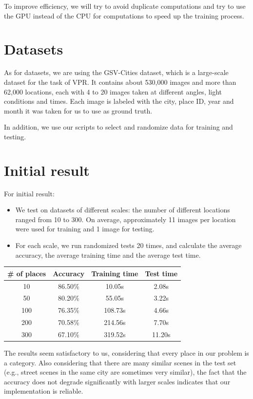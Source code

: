 \documentclass{article}
\begin{document}
To improve efficiency, we will try to avoid duplicate computations and try to use the GPU instead of the CPU for computations to speed up the training process.

\section{Datasets}

As for datasets, we are using the GSV-Cities dataset\cite{ali2022gsv}, which is a large-scale dataset for the task of VPR. It contains about 530,000 images and more than 62,000 locations, each with 4 to 20 images taken at different angles, light conditions and times. Each image is labeled with the city, place ID, year and month it was taken for us to use as ground truth.

In addition, we use our scripts to select and randomize data for training and testing.

\section{Initial result}

For initial result:

\begin{itemize}
    \item We test on datasets of different scales: the number of different locations ranged from 10 to 300. On average, approximately 11 images per location were used for training and 1 image for testing.
    \item For each scale, we run randomized tests 20 times, and calculate the average accuracy, the average training time and the average test time.
\end{itemize}

\begin{tabular}{|c|c|c|c|}
    \hline \textbf{\# of places} & \textbf{Accuracy} & \textbf{Training time} & \textbf{Test time}\\
    \hline 10 & 86.50\% & 10.05s & 2.08s\\
    \hline 50 & 80.20\% & 55.05s & 3.22s\\
    \hline 100 & 76.35\% & 108.73s & 4.66s\\
    \hline 200 & 70.58\% & 214.56s & 7.70s\\
    \hline 300 & 67.10\% & 319.52s & 11.20s\\
    \hline
\end{tabular}

The results seem satisfactory to us, considering that every place in our problem is a category. Also considering that there are many similar scenes in the test set (e.g., street scenes in the same city are sometimes very similar), the fact that the accuracy does not degrade significantly with larger scales indicates that our implementation is reliable.
\end{document}
